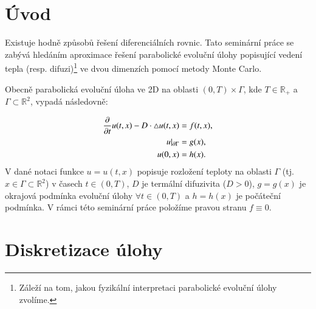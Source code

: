 \documentclass[11pt,american,czech]{article}
\newcommand*\Laplace{\mathop{}\!\mathbin\bigtriangleup}
\begin{document}
\begin{titlepage}
	
%	
	
	\vfill %
	
\end{titlepage}


\section{Úvod}\label{sec:1}

Existuje hodně způsobů řešení diferenciálních rovnic. Tato seminární práce se zabývá hledáním aproximace řešení parabolické evoluční úlohy popisující vedení tepla (resp. difuzi)\footnote{Záleží na tom, jakou fyzikální interpretaci parabolické evoluční úlohy zvolíme.} ve dvou dimenzích pomocí metody Monte Carlo.

\medskip

Obecně parabolická evoluční úloha ve 2D  na oblasti $(0,T)\times\Gamma$, kde $T\in\mathbb{R}_{+}$ a $\Gamma\subset\mathbb{R}^{2}$, vypadá následovně:

\begin{equation} \label{ini_problem}
	\begin{split}
		\frac{\partial}{\partial t}u(t,x)-D\cdot\Laplace u(t,x)&=f(t,x) ,\\
		u\arrowvert_{\partial\Gamma}&=g(x),\\
		u(0,x)&=h(x).
	\end{split}
\end{equation}
\noindent 
V dané notaci funkce $u=u(t,x)$ popisuje rozložení teploty na oblasti $\Gamma$ (tj. $x\in\Gamma\subset\mathbb{R}^{2}$) v časech $t\in(0,T)$, $D$ je termální difuzivita ($D>0$), $g=g(x)$ je okrajová podmínka evoluční úlohy $\forall t\in(0,T)$ a $h=h(x)$ je počáteční podmínka. V rámci této seminární práce položíme pravou stranu $f\equiv 0$.

\section{Diskretizace úlohy}\label{sec:2}
\end{document}
